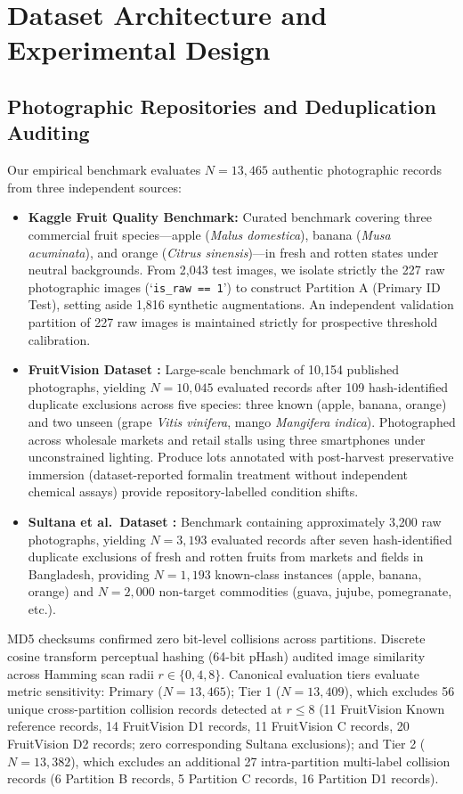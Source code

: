 \section{Dataset Architecture and Experimental Design}
\label{sec:dataset_and_design}

\subsection{Photographic Repositories and Deduplication Auditing}
Our empirical benchmark evaluates $N = 13,465$ authentic photographic records from three independent sources:
\begin{itemize}
\setlength{\itemsep}{0pt}\setlength{\parsep}{0pt}\setlength{\parskip}{0pt}\setlength{\topsep}{1pt}\setlength{\partopsep}{0pt}
\item \textbf{Kaggle Fruit Quality Benchmark:} Curated benchmark covering three commercial fruit species---apple (\textit{Malus domestica}), banana (\textit{Musa acuminata}), and orange (\textit{Citrus sinensis})---in fresh and rotten states under neutral backgrounds. From 2,043 test images, we isolate strictly the 227 raw photographic images (`\texttt{is\_raw == 1}') to construct Partition A (Primary ID Test), setting aside 1,816 synthetic augmentations. An independent validation partition of 227 raw images is maintained strictly for prospective threshold calibration.
\item \textbf{FruitVision Dataset \cite{bijoy2025fruitvision}:} Large-scale benchmark of 10,154 published photographs, yielding $N = 10,045$ evaluated records after 109 hash-identified duplicate exclusions across five species: three known (apple, banana, orange) and two unseen (grape \textit{Vitis vinifera}, mango \textit{Mangifera indica}). Photographed across wholesale markets and retail stalls using three smartphones under unconstrained lighting. Produce lots annotated with post-harvest preservative immersion (dataset-reported formalin treatment without independent chemical assays) provide repository-labelled condition shifts.
\item \textbf{Sultana et al.\ Dataset \cite{sultana2022extensive}:} Benchmark containing approximately 3,200 raw photographs, yielding $N = 3,193$ evaluated records after seven hash-identified duplicate exclusions of fresh and rotten fruits from markets and fields in Bangladesh, providing $N = 1,193$ known-class instances (apple, banana, orange) and $N = 2,000$ non-target commodities (guava, jujube, pomegranate, etc.).
\end{itemize}
MD5 checksums confirmed zero bit-level collisions across partitions. Discrete cosine transform perceptual hashing (64-bit pHash) audited image similarity across Hamming scan radii $r \in \{0, 4, 8\}$. Canonical evaluation tiers evaluate metric sensitivity: Primary ($N = 13,465$); Tier 1 ($N = 13,409$), which excludes 56 unique cross-partition collision records detected at $r \le 8$ (11 FruitVision Known reference records, 14 FruitVision D1 records, 11 FruitVision C records, 20 FruitVision D2 records; zero corresponding Sultana exclusions); and Tier 2 ($N = 13,382$), which excludes an additional 27 intra-partition multi-label collision records (6 Partition B records, 5 Partition C records, 16 Partition D1 records).

